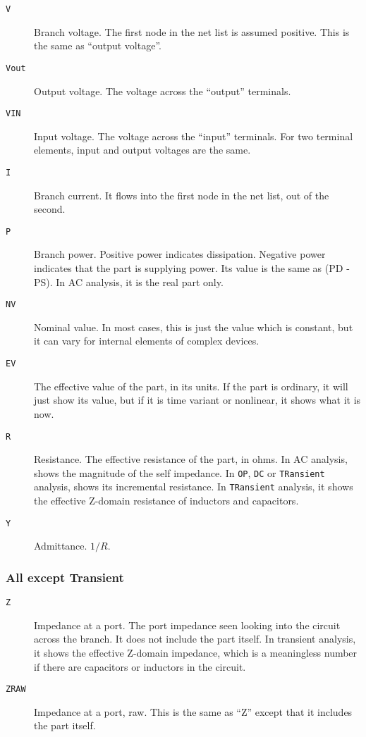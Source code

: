 \begin{description}

\item[{\tt V}] Branch voltage.  The first node in the net list is assumed
positive.  This is the same as ``output voltage''.

\item[{\tt Vout}] Output voltage.  The voltage across the ``output''
terminals. 

\item[{\tt VIN}] Input voltage.  The voltage across the ``input''
terminals.  For two terminal elements, input and output voltages are
the same.

\item[{\tt I}] Branch current.  It flows into the first node in the net
list, out of the second.

\item[{\tt P}] Branch power.  Positive power indicates dissipation. 
Negative power indicates that the part is supplying power.  Its value 
is the same as (PD - PS).  In AC analysis, it is the real part only.

\item[{\tt NV}] Nominal value.  In most cases, this is just the value
which is constant, but it can vary for internal elements of complex
devices. 

\item[{\tt EV}] The effective value of the part, in its units.  If the part
is ordinary, it will just show its value, but if it is time variant or
nonlinear, it shows what it is now.

\item[{\tt R}] Resistance.  The effective resistance of the part, in ohms.
In AC analysis, shows the magnitude of the self impedance.  In {\tt OP},
{\tt DC} or {\tt TRansient} analysis, shows its incremental resistance.  In
{\tt TRansient} analysis, it shows the effective Z-domain resistance of
inductors and capacitors.

\item[{\tt Y}] Admittance.  $1/R$.

\end{description}
\subsubsection{All except Transient}

\begin{description}

\item[{\tt Z}] Impedance at a port.  The port impedance seen looking
into the circuit across the branch.  It does not include the part
itself.  In transient analysis, it shows the effective Z-domain
impedance, which is a meaningless number if there are capacitors or
inductors in the circuit.

\item[{\tt ZRAW}] Impedance at a port, raw.  This is the same as ``Z'' 
except that it includes the part itself.

\end{description}
